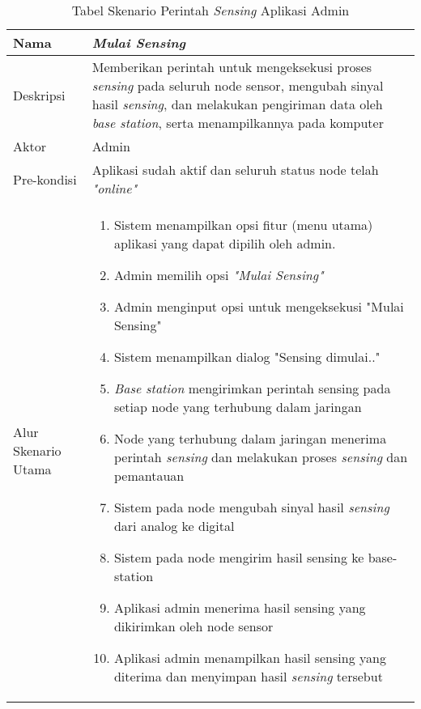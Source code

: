     
    \begin{table}[H]
        \centering
        \caption{Tabel Skenario Perintah \textit{Sensing} Aplikasi Admin}
        \begin{tabular}{|p{3cm}|p{10cm}|}
        \hline
            Nama & \textit{Mulai Sensing}\\
        \hline 
        \hline
            Deskripsi & Memberikan perintah untuk mengeksekusi proses \textit{sensing} pada seluruh node sensor, mengubah sinyal hasil \textit{sensing}, dan melakukan pengiriman data oleh \textit{base station}, serta menampilkannya pada komputer\\
        \hline
            Aktor & Admin \\
        \hline
            Pre-kondisi & Aplikasi sudah aktif dan seluruh status node telah \textit{"online"}\\
        \hline
            Alur Skenario Utama & 
             \begin{enumerate}
                \item Sistem menampilkan opsi fitur (menu utama) aplikasi yang dapat dipilih oleh admin.
                \item Admin memilih opsi \textit{"Mulai Sensing"}
                \item Admin menginput opsi untuk mengeksekusi "Mulai Sensing"
                \item Sistem menampilkan dialog "Sensing dimulai.."
                \item \textit{Base station} mengirimkan perintah sensing pada setiap node yang terhubung dalam jaringan
                \item Node yang terhubung dalam jaringan menerima perintah \textit{sensing} dan melakukan proses \textit{sensing} dan pemantauan
                \item Sistem pada node mengubah sinyal hasil \textit{sensing} dari analog ke digital
                \item Sistem pada node mengirim hasil sensing ke base-station
                \item Aplikasi admin menerima hasil sensing yang dikirimkan oleh node sensor
                \item Aplikasi admin menampilkan hasil sensing yang diterima dan menyimpan hasil \textit{sensing} tersebut
            \end{enumerate}\\
        \hline
        \end{tabular}
        \label{tab:skenario4}
    \end{table}
    
